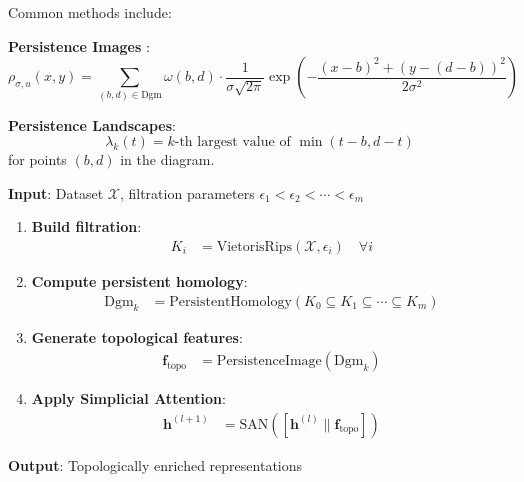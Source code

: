 \begin{definition}\label{def:representaciones_persistencia}
Common methods include:

\textbf{Persistence Images} \citep{adams2017persistence}:
\begin{equation}
    \rho_{\sigma,u}(x,y) = \sum_{(b,d) \in \text{Dgm}} \omega(b,d) \cdot \frac{1}{\sigma\sqrt{2\pi}} \exp\left(-\frac{(x-b)^2 + (y-(d-b))^2}{2\sigma^2}\right)
\end{equation}

\textbf{Persistence Landscapes}:
\begin{equation}
    \lambda_k(t) = k\text{-th largest value of } \min(t-b, d-t)
\end{equation}
for points $(b,d)$ in the diagram.
\end{definition}

\begin{algorithm}
\caption{Simplicial Attention with TDA}\label{alg:sat_tda}
\textbf{Input}: Dataset $\mathcal{X}$, filtration parameters $\epsilon_1 < \epsilon_2 < \cdots < \epsilon_m$

\begin{enumerate}
    \item \textbf{Build filtration}:
    \begin{align}
        K_i &= \text{VietorisRips}(\mathcal{X}, \epsilon_i) \quad \forall i
    \end{align}

    \item \textbf{Compute persistent homology}:
    \begin{align}
        \text{Dgm}_k &= \text{PersistentHomology}(K_0 \subseteq K_1 \subseteq \cdots \subseteq K_m)
    \end{align}

    \item \textbf{Generate topological features}:
    \begin{align}
        \mathbf{f}_{\text{topo}} &= \text{PersistenceImage}(\text{Dgm}_k)
    \end{align}

    \item \textbf{Apply Simplicial Attention}:
    \begin{align}
        \mathbf{h}^{(l+1)} &= \text{SAN}([\mathbf{h}^{(l)} \| \mathbf{f}_{\text{topo}}])
    \end{align}
\end{enumerate}

\textbf{Output}: Topologically enriched representations
\end{algorithm}

